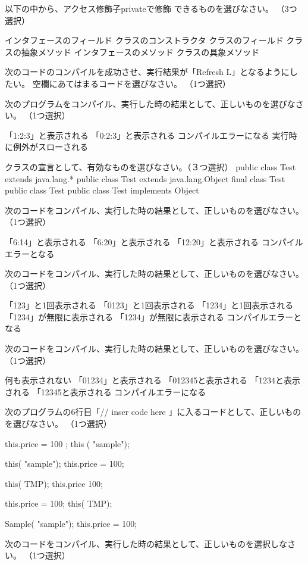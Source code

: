 \documentclass[12pt]{article}
\begin{document}
以下の中から、アクセス修飾子privateで修飾
できるものを選びなさい。
（3つ選択）

インタフェースのフィールド
クラスのコンストラクタ
クラスのフィールド
クラスの抽象メソッド
インタフェースのメソッド
クラスの具象メソッド

次のコードのコンパイルを成功させ、実行結果が「Refresh L」となるようにしたい。
空欄にあてはまるコードを選びなさい。
（1つ選択）





次のプログラムをコンパイル、実行した時の結果として、正しいものを選びなさい。
（1つ選択）


「1:2:3」と表示される
「0:2:3」と表示される
コンパイルエラーになる
実行時に例外がスローされる

クラスの宣言として、有効なものを選びなさい。（３つ選択）
public class Test extends java.lang.* { }
public class Test extends java.lang.Object{}
final class Test{}
public class Test{}
public class Test implements Object{}

次のコードをコンパイル、実行した時の結果として、正しいものを選びなさい。
（1つ選択）


「6:14」と表示される
「6:20」と表示される
「12:20」と表示される
コンパイルエラーとなる


次のコードをコンパイル、実行した時の結果として、正しいものを選びなさい。（1つ選択）

「123」と1回表示される
「0123」と1回表示される
「1234」と1回表示される
「1234」が無限に表示される
「1234」が無限に表示される
コンパイルエラーとなる


次のコードをコンパイル、実行した時の結果として、正しいものを選びなさい。（1つ選択）


何も表示されない
「01234」と表示される
「012345と表示される
「1234と表示される
「12345と表示される
コンパイルエラーになる


次のプログラムの6行目「// inser code here 」に入るコードとして、正しいものを選びなさい。
（1つ選択）


this.price = 100 ;
this ( "sample");

this( "sample");
this.price = 100;

this( TMP);
this.price  100;

this.price = 100;
this( TMP);

Sample( "sample");
this.price = 100;


次のコードをコンパイル、実行した時の結果として、正しいものを選択しなさい。
（1つ選択）

\end{document}
